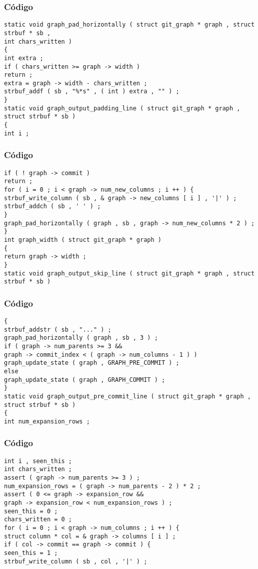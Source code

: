 \documentclass{beamer}
\begin{document}
\begin{frame}[fragile]
\frametitle{C\'odigo}
\begin{verbatim}
static void graph_pad_horizontally ( struct git_graph * graph , struct strbuf * sb , 
int chars_written ) 
{ 
int extra ; 
if ( chars_written >= graph -> width ) 
return ; 
extra = graph -> width - chars_written ; 
strbuf_addf ( sb , "%*s" , ( int ) extra , "" ) ; 
} 
static void graph_output_padding_line ( struct git_graph * graph , 
struct strbuf * sb ) 
{ 
int i ; 
\end{verbatim}
\end{frame}
\begin{frame}[fragile]
\frametitle{C\'odigo}
\begin{verbatim}
if ( ! graph -> commit ) 
return ; 
for ( i = 0 ; i < graph -> num_new_columns ; i ++ ) { 
strbuf_write_column ( sb , & graph -> new_columns [ i ] , '|' ) ; 
strbuf_addch ( sb , ' ' ) ; 
} 
graph_pad_horizontally ( graph , sb , graph -> num_new_columns * 2 ) ; 
} 
int graph_width ( struct git_graph * graph ) 
{ 
return graph -> width ; 
} 
static void graph_output_skip_line ( struct git_graph * graph , struct strbuf * sb ) 
\end{verbatim}
\end{frame}
\begin{frame}[fragile]
\frametitle{C\'odigo}
\begin{verbatim}
{ 
strbuf_addstr ( sb , "..." ) ; 
graph_pad_horizontally ( graph , sb , 3 ) ; 
if ( graph -> num_parents >= 3 && 
graph -> commit_index < ( graph -> num_columns - 1 ) ) 
graph_update_state ( graph , GRAPH_PRE_COMMIT ) ; 
else 
graph_update_state ( graph , GRAPH_COMMIT ) ; 
} 
static void graph_output_pre_commit_line ( struct git_graph * graph , 
struct strbuf * sb ) 
{ 
int num_expansion_rows ; 
\end{verbatim}
\end{frame}
\begin{frame}[fragile]
\frametitle{C\'odigo}
\begin{verbatim}
int i , seen_this ; 
int chars_written ; 
assert ( graph -> num_parents >= 3 ) ; 
num_expansion_rows = ( graph -> num_parents - 2 ) * 2 ; 
assert ( 0 <= graph -> expansion_row && 
graph -> expansion_row < num_expansion_rows ) ; 
seen_this = 0 ; 
chars_written = 0 ; 
for ( i = 0 ; i < graph -> num_columns ; i ++ ) { 
struct column * col = & graph -> columns [ i ] ; 
if ( col -> commit == graph -> commit ) { 
seen_this = 1 ; 
strbuf_write_column ( sb , col , '|' ) ; 
\end{verbatim}
\end{frame}
\end{document}
